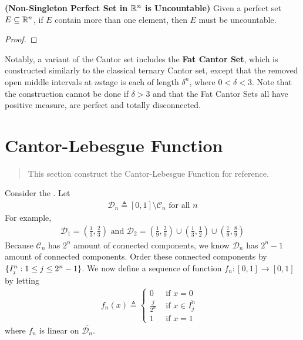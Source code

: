 \documentclass{report}
\begin{document}
\begin{theorem}
\label{NSP}
\textbf{(Non-Singleton Perfect Set in $\mathbb{R}^n$ is Uncountable)} Given a perfect set $E\subseteq \mathbb{R}^n$, if $E$ contain more than one element, then  $E$ must be uncountable.
\end{theorem}
\begin{proof}

\end{proof}
\begin{mdframed}
Notably, a variant of the Cantor set includes the \textbf{Fat Cantor Set}, which is constructed similarly to the classical ternary Cantor set, except that the removed open middle intervals at $n$stage is each of length $\delta^n$, where $0 < \delta < 3$. Note that the construction cannot be done if $\delta > 3$ and that the Fat Cantor Sets all have positive measure, are perfect and totally disconnected.  
\end{mdframed}
\section{Cantor-Lebesgue Function}
\begin{abstract}
This section construct the Cantor-Lebesgue Function for reference.
\end{abstract}
\begin{mdframed}
Consider the . Let 
\begin{align*}
\mathcal{D}_n \triangleq [0,1]\setminus \mathcal{C}_n\text{ for all }n
\end{align*}
For example,
\begin{align*}
\mathcal{D}_1=(\frac{1}{3},\frac{2}{3})\text{ and }\mathcal{D}_2= (\frac{1}{9},\frac{2}{9})\cup (\frac{1}{3},\frac{1}{2})\cup  (\frac{7}{9},\frac{8}{9})
\end{align*}
Because $\mathcal{C}_n$ has $2^n$ amount of connected components, we know  $\mathcal{D}_n$ has $2^n-1$ amount of connected components. Order these connected components by  $\{ I^n_j: 1\leq j\leq 2^n-1 \}$. We now define a sequence of function $f_n:[0,1]\rightarrow [0,1]$ by letting 
\begin{align*}
f_n(x)\triangleq \begin{cases}
0& \text{ if $x=0$ }\\
\frac{j}{2^n}& \text{ if $x\in \overline{I_j^n}$ }\\
1& \text{ if $x=1$ }
\end{cases}
\end{align*}
where $f_n$ is linear on  $\overline{\mathcal{D}_n}$. 
\end{mdframed}
\end{document}
